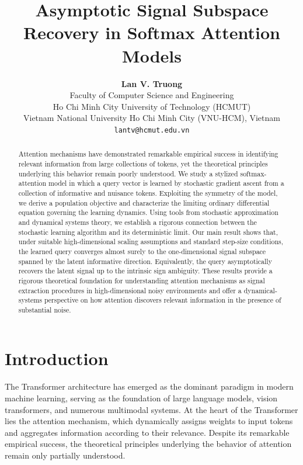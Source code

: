 \documentclass[11pt,a4paper]{article}
\title{\textbf{Asymptotic Signal Subspace Recovery in Softmax Attention Models}}
\author{\textbf{Lan V. Truong}\\
Faculty of Computer Science and Engineering\\
Ho Chi Minh City University of Technology (HCMUT)\\
Vietnam National University Ho Chi Minh City (VNU-HCM), Vietnam\\
\texttt{lantv@hcmut.edu.vn}}
\date{}
\theoremstyle{definition}
\begin{document}
\maketitle

\begin{abstract}
Attention mechanisms have demonstrated remarkable empirical success in identifying relevant information from large collections of tokens, yet the theoretical principles underlying this behavior remain poorly understood. We study a stylized softmax-attention model in which a query vector is learned by stochastic gradient ascent from a collection of informative and nuisance tokens. Exploiting the symmetry of the model, we derive a population objective and characterize the limiting ordinary differential equation governing the learning dynamics. Using tools from stochastic approximation and dynamical systems theory, we establish a rigorous connection between the stochastic learning algorithm and its deterministic limit. Our main result shows that, under suitable high-dimensional scaling assumptions and standard step-size conditions, the learned query converges almost surely to the one-dimensional signal subspace spanned by the latent informative direction. Equivalently, the query asymptotically recovers the latent signal up to the intrinsic sign ambiguity. These results provide a rigorous theoretical foundation for understanding attention mechanisms as signal extraction procedures in high-dimensional noisy environments and offer a dynamical-systems perspective on how attention discovers relevant information in the presence of substantial noise.
\end{abstract}

\tableofcontents

\newpage

\section{Introduction}

The Transformer architecture has emerged as the dominant paradigm in modern machine learning, serving as the foundation of large language models, vision transformers, and numerous multimodal systems. At the heart of the Transformer lies the attention mechanism, which dynamically assigns weights to input tokens and aggregates information according to their relevance. Despite its remarkable empirical success, the theoretical principles underlying the behavior of attention remain only partially understood.
\end{document}
